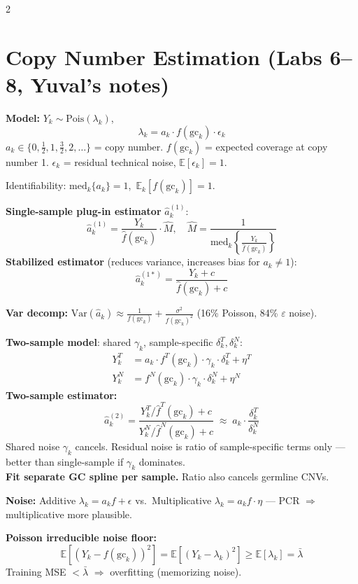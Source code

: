 \documentclass[12pt,a4paper]{article}
\newcommand{\E}{\mathbb{E}}
\newcommand{\Var}{\mathrm{Var}}
\newcommand{\med}{\mathrm{med}}
\newcommand{\gc}{\text{gc}}
\begin{document}
\begin{multicols}{2}
\section*{Copy Number Estimation (Labs 6--8, Yuval's notes)}

\textbf{Model:} $Y_k \sim \text{Pois}(\lambda_k)$,
\[
  \lambda_k = a_k \cdot f(\gc_k) \cdot \epsilon_k
\]
$a_k \in \{0, \tfrac{1}{2}, 1, \tfrac{3}{2}, 2,\ldots\}$ = copy number.
$f(\gc_k)$ = expected coverage at copy number 1.
$\epsilon_k$ = residual technical noise, $\E[\epsilon_k]=1$.

Identifiability: $\med_k\{a_k\}=1$,\ $\E_k[f(\gc_k)]=1$.

\textbf{Single-sample plug-in estimator} $\hat a_k^{(1)}$:
\[
  \hat a_k^{(1)} = \frac{Y_k}{\hat f(\gc_k)} \cdot \hat M, \quad \hat M = \frac{1}{\med_k\!\left\{\frac{Y_k}{\hat f(\gc_k)}\right\}}
\]
\textbf{Stabilized estimator} (reduces variance, increases bias for $a_k \neq 1$):
\[
  \hat a_k^{(1*)} = \frac{Y_k + c}{\hat f(\gc_k) + c}
\]

\textbf{Var decomp:} $\Var(\hat a_k) \approx \frac{1}{f(\gc_k)} + \frac{\sigma^2}{f(\gc_k)^2}$ (16\% Poisson, 84\% $\varepsilon$ noise).

\textbf{Two-sample model}: shared $\gamma_k$, sample-specific $\delta_k^T,\delta_k^N$:
\begin{align*}
  Y_k^T &= a_k \cdot f^T(\gc_k) \cdot \gamma_k \cdot \delta_k^T + \eta^T\\
  Y_k^N &= f^N(\gc_k) \cdot \gamma_k \cdot \delta_k^N + \eta^N
\end{align*}
\textbf{Two-sample estimator:}
\[
  \hat a_k^{(2)} = \frac{Y_k^T/\hat f^T(\gc_k) + c}{Y_k^N/\hat f^N(\gc_k) + c}
  \;\approx\; a_k \cdot \frac{\delta_k^T}{\delta_k^N}
\]
Shared noise $\gamma_k$ cancels. Residual noise is ratio of sample-specific terms only — better than single-sample if $\gamma_k$ dominates.\\
\textbf{Fit separate GC spline per sample.} Ratio also cancels germline CNVs.

\textbf{Noise:} Additive $\lambda_k=a_kf+\epsilon$ vs.\ Multiplicative $\lambda_k=a_kf\cdot\eta$ — PCR $\Rightarrow$ multiplicative more plausible.

\textbf{Poisson irreducible noise floor:}
\[
  \E\!\left[(Y_k - f(\gc_k))^2\right] = \E\!\left[(Y_k - \lambda_k)^2\right] \geq \E[\lambda_k] = \bar\lambda
\]
Training MSE $< \bar\lambda$ $\Rightarrow$ overfitting (memorizing noise).


\end{multicols}
\end{document}
